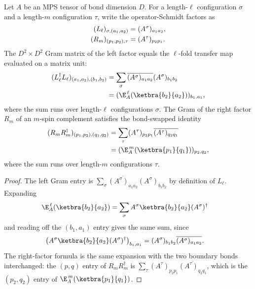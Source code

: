 \begin{lemma}
    \label{lem:schmidt_gram_transfer_power}
    \leanok
    Let $A$ be an MPS tensor of bond dimension $D$. For a length-$\ell$
    configuration $\sigma$ and a length-$m$ configuration $\tau$, write the
    operator-Schmidt factors as
    \begin{align}
        (L_\ell)_{\sigma,(a_1,a_2)}
         & =(A^\sigma)_{a_1a_2},
        \notag                   \\
        (R_m)_{(p_1,p_2),\tau}
         & =(A^\tau)_{p_2p_1}.
        \notag
    \end{align}
    The $D^2\times D^2$ Gram matrix of the left factor equals the $\ell$-fold
    transfer map evaluated on a matrix unit:
    \begin{align}
        (L_\ell^\dagger L_\ell)_{(a_1,a_2),(b_1,b_2)}
         & =
        \sum_{\sigma}\overline{(A^\sigma)_{a_1a_2}}
        (A^\sigma)_{b_1b_2}
        \notag \\
         & =
        (\E_A^{\,\ell}(\ketbra{b_2}{a_2}))_{b_1,a_1},
        \notag
    \end{align}
    where the sum runs over length-$\ell$ configurations $\sigma$. The Gram of
    the right factor $R_m$ of an $m$-spin complement satisfies the bond-swapped
    identity
    \begin{align}
        (R_mR_m^\dagger)_{(p_1,p_2),(q_1,q_2)}
         & =
        \sum_{\tau}(A^\tau)_{p_2p_1}
        \overline{(A^\tau)_{q_2q_1}}
        \notag \\
         & =
        (\E_A^{\,m}(\ketbra{p_1}{q_1}))_{p_2,q_2},
        \notag
    \end{align}
    where the sum runs over length-$m$ configurations $\tau$.
\end{lemma}
\begin{proof}\leanok
    The left Gram entry is
    $\sum_\sigma\overline{(A^\sigma)_{a_1a_2}}(A^\sigma)_{b_1b_2}$
    by definition of $L_\ell$. Expanding
    \begin{align}
        \E_A^{\,\ell}(\ketbra{b_2}{a_2})
         & =
        \sum_\sigma
        A^\sigma\ketbra{b_2}{a_2}(A^\sigma)^\dagger
        \notag
    \end{align}
    and reading off the $(b_1,a_1)$ entry gives the same sum, since
    \begin{align}
        \bigl(      A^\sigma\ketbra{b_2}{a_2}(A^\sigma)^\dagger
        \bigr)_{b_1,a_1}
         & =
        (A^\sigma)_{b_1b_2}
        \overline{(A^\sigma)_{a_1a_2}}.
        \notag
    \end{align}
    The right-factor formula is the same expansion with the two boundary bonds
    interchanged: the $(p,q)$ entry of $R_mR_m^\dagger$ is
    $\sum_\tau(A^\tau)_{p_2p_1}\overline{(A^\tau)_{q_2q_1}}$, which is the
    $(p_2,q_2)$ entry of $\E_A^{\,m}(\ketbra{p_1}{q_1})$.
\end{proof}

